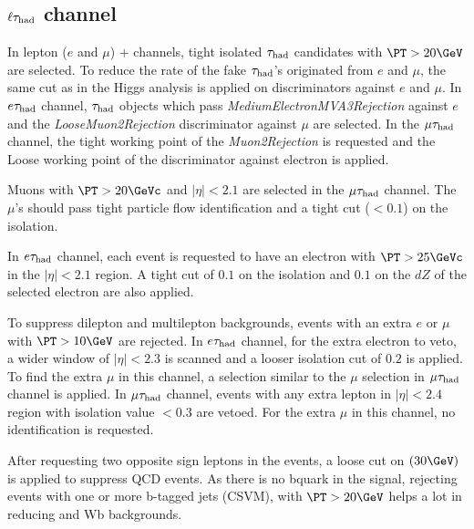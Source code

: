 \subsection{\texorpdfstring{$\ell\tau_{\rm had}$ channel}{lepton-tau channel}}
\label{sect:leptonTauCuts}
In lepton ($e$ and $\mu$) $+$ \Tau channels, tight isolated $\tau_{\rm had}$ candidates with $\PT > 20 \GeV$  are selected. To reduce the rate of the fake $\tau_{\rm had}$'s originated from $e$ and $\mu$, the same cut as in the Higgs analysis \cite{CMS_AN_2013-171} is applied on discriminators against $e$ and $\mu$. In $e\tau_{\rm had}$ channel, $\tau_{\rm had}$ objects which pass \emph{MediumElectronMVA3Rejection} against $e$ and the \emph{LooseMuon2Rejection} discriminator against $\mu$ are selected. In the $\mu\tau_{\rm had}$ channel, the tight working point of the \emph{Muon2Rejection} is requested and the Loose working point of the discriminator against electron is applied.

Muons with $\PT > 20 \GeVc$ and $|\eta|<2.1$ are selected in the $\mu\tau_{\rm had}$ channel. The $\mu$'s should pass tight particle flow identification and a tight cut ($<0.1$) on the isolation.
 
In $e\tau_{\rm had}$ channel, each event is requested to have an electron with $\PT >25 \GeVc$ in the $|\eta| < 2.1 $ region. A tight cut of $0.1$ on the isolation and $0.1$ on the $dZ$ of the selected electron are also applied.

To suppress dilepton and multilepton backgrounds, events with an extra $e$ or $\mu$ with $\PT >10 \GeV$ are rejected. In $e\tau_{\rm had}$ channel, for the extra electron to veto, a wider window of $|\eta|<2.3$ is scanned and a looser isolation cut of $0.2$ is applied. To find the extra $\mu$ in this channel, a selection similar to the $\mu$ selection in $\mu\tau_{\rm had}$ channel is applied. In $\mu\tau_{\rm had}$ channel, events with any extra lepton in $|\eta|<2.4$ region with isolation value $<0.3$ are vetoed. For the extra $\mu$ in this channel, no identification is requested.


After requesting two opposite sign leptons in the events, a loose cut on \MET $(30 \GeV)$ is applied to suppress QCD events. As there is no bquark in the signal, rejecting events with one or more b-tagged jets (CSVM), with $\PT > 20 \GeV$ helps a lot in reducing \ttbar and Wb backgrounds.

